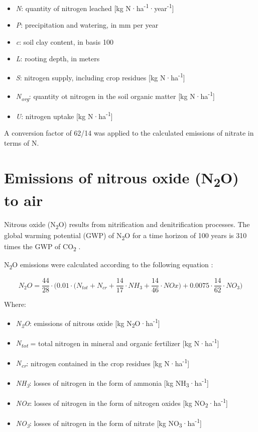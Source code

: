 \documentclass[openany]{book}
\begin{document}
\begin{itemize}
\item
  \emph{N}: quantity of nitrogen leached {[}kg N·ha\textsuperscript{-1}·year\textsuperscript{-1}{]}
\item
  \emph{P}: precipitation and watering, in mm per year
\item
  \emph{c}: soil clay content, in basis 100
\item
  \emph{L}: rooting depth, in meters
\item
  \emph{S}: nitrogen supply, including crop residues {[}kg N·ha\textsuperscript{-1}{]}
\item
  \emph{N\textsubscript{org}}: quantity ot nitrogen in the soil organic matter {[}kg N·ha\textsuperscript{-1}{]}
\item
  \emph{U}: nitrogen uptake {[}kg N·ha\textsuperscript{-1}{]}
\end{itemize}

A conversion factor of 62/14 was applied to the calculated emissions of nitrate in terms of N.

\hypertarget{emissions-of-nitrous-oxide-n2o-to-air}{%
\section{\texorpdfstring{Emissions of nitrous oxide (N\textsubscript{2}O) to air}{Emissions of nitrous oxide (N2O) to air}}\label{emissions-of-nitrous-oxide-n2o-to-air}}

Nitrous oxide (N\textsubscript{2}O) results from nitrification and denitrification processes. The global warming potential (GWP) of N\textsubscript{2}O for a time horizon of 100 years is 310 times the GWP of CO\textsubscript{2} \citep{IPCC2006}.

N\textsubscript{2}O emissions were calculated according to the following equation \citep{IPCC2006}:

\[N_2O = \frac{44}{28} \cdot \bigg (0.01 \cdot \Big(N_{tot} + N_{cr} + \frac{14}{17} \cdot NH_3 + \frac{14}{46} \cdot NOx \Big) + 0.0075 \cdot \frac{14}{62} \cdot NO_3 \bigg)\]

Where:

\begin{itemize}
\item
  \emph{N\textsubscript{2}O}: emissions of nitrous oxide {[}kg N\textsubscript{2}O·ha\textsuperscript{-1}{]}
\item
  \emph{N\textsubscript{tot}} = total nitrogen in mineral and organic fertilizer {[}kg N·ha\textsuperscript{-1}{]}
\item
  \emph{N\textsubscript{cr}}: nitrogen contained in the crop residues {[}kg N·ha\textsuperscript{-1}{]}
\item
  \emph{NH\textsubscript{3}}: losses of nitrogen in the form of ammonia {[}kg NH\textsubscript{3}·ha\textsuperscript{-1}{]}
\item
  \emph{NOx}: losses of nitrogen in the form of nitrogen oxides {[}kg NO\textsubscript{2}·ha\textsuperscript{-1}{]}
\item
  \emph{NO\textsubscript{3}}: losses of nitrogen in the form of nitrate {[}kg NO\textsubscript{3}·ha\textsuperscript{-1}{]}
\end{itemize}
\end{document}
